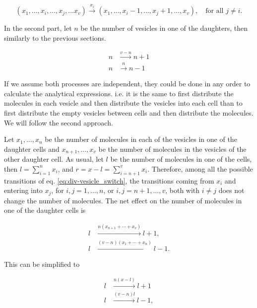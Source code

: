 \begin{equation}
  \label{eq:div-vesicle_switch}
  (x_1,\dotsc,x_i,\dotsc,x_j,\dotsc x_v) \xrightarrow{x_i} (x_1,\dotsc,x_i-1,\dotsc,x_j+1,\dotsc, x_v),\quad \text{for all } j\neq i.
\end{equation}

In the second part, let $n$ be the number of vesicles in one of the daughters, then similarly to the previous sections.

\begin{equation}
  \label{eq:div-arr_clust}
  \begin{split}
    n &\xrightarrow{v-n} n+1\\
    n &\xrightarrow{n} n-1
  \end{split}
\end{equation}

If we assume both processes are independent, they could be done in any order to calculate the analytical expressions. i.e. it is the same to first distribute the molecules in each vesicle and then distribute the vesicles into each cell than to first distribute the empty vesicles between cells and then distribute the molecules. We will follow the second approach.

Let $x_1,\dotsc,x_n$ be the number of molecules in each of the vesicles in one of the daughter cells and $x_{n+1},\dotsc,x_v$ be the number of molecules in the vesicles of the other daughter cell. As usual, let $l$ be the number of molecules in one of the cells, then $l = \sum_{i=1}^nx_i$, and $r = x-l = \sum_{i=n+1}^vx_i$. Therefore, among all the possible transitions of eq. \eqref{eq:div-vesicle_switch}, the transitions coming from $x_i$ and entering into $x_j$, for $i,j=1,\dotsc,n$, or $i,j=n+1,\dotsc,v$, both with $i\neq j$ does not change the number of molecules. The net effect on the number of molecules in one of the daughter cells is

\begin{equation}
  \begin{split}
    l&\xrightarrow{n(x_{n+1}+\dotsb+x_{v})}l+1,\\
    l&\xrightarrow{(v-n)(x_1+\dotsb+x_n)}l-1.
  \end{split}
\end{equation}

This can be simplified to

\begin{equation}
  \begin{split}
    l&\xrightarrow{n(x-l)}l+1\\
    l&\xrightarrow{(v-n)l}l-1,
  \end{split}
\end{equation}

